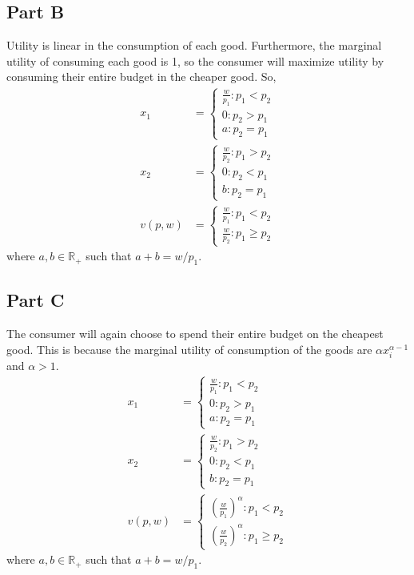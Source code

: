 \documentclass[11pt]{article} %
\begin{document}
\subsection{Part B}
Utility is linear in the consumption of each good. Furthermore, the marginal utility of consuming each good is 1, so the consumer will maximize utility by consuming their entire budget in the cheaper good. So, 
\begin{align*}
x_1 &= \begin{cases} \frac{w}{p_1} : p_1<p_2\\0: p_2>p_1 \\a: p_2=p_1  \end{cases} \\
x_2 &= \begin{cases} \frac{w}{p_2} : p_1>p_2\\0: p_2<p_1 \\ b: p_2=p_1 \end{cases} \\
v(p,w) &=  \begin{cases} \frac{w}{p_1} : p_1<p_2\\ \frac{w}{p_2}: p_1\geq p_2 \end{cases} 
\end{align*}
where $a,b\in \mathbb{R}_+ $ such that $a+b=w/p_1$.
\subsection{Part C}
The consumer will again choose to spend their entire budget on the cheapest good. This is because the marginal utility of consumption of the goods are $\alpha x_i^{\alpha-1}$ and $\alpha>1.$
\begin{align*}
x_1 &= \begin{cases} \frac{w}{p_1} : p_1<p_2\\0: p_2>p_1 \\ a: p_2=p_1 \end{cases} \\
x_2 &= \begin{cases} \frac{w}{p_2} : p_1>p_2\\0: p_2<p_1 \\ b: p_2=p_1 \end{cases} \\
v(p,w) &=  \begin{cases} \left(\frac{w}{p_1}\right)^{\alpha} : p_1<p_2\\ \left(\frac{w}{p_2}\right)^{\alpha}: p_1\geq p_2 \end{cases} 
\end{align*}
where $a,b\in \mathbb{R}_+ $ such that $a+b=w/p_1$.
\end{document}
